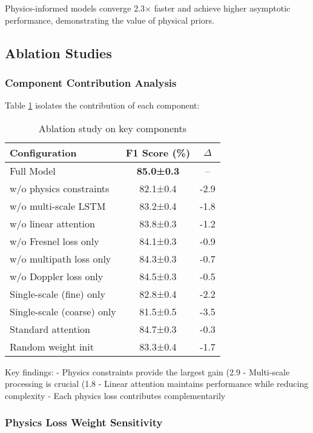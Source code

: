 \documentclass[10pt,journal,compsoc]{IEEEtran}
\begin{document}
Physics-informed models converge 2.3× faster and achieve higher asymptotic performance, demonstrating the value of physical priors.

\subsection{Ablation Studies}

\subsubsection{Component Contribution Analysis}

Table \ref{tab:ablation} isolates the contribution of each component:

\begin{table}[h]
\centering
\caption{Ablation study on key components}
\label{tab:ablation}
\begin{tabular}{lcc}
\toprule
Configuration & F1 Score (\%) & $\Delta$ \\
\midrule
Full Model & \textbf{85.0±0.3} & -- \\
\midrule
w/o physics constraints & 82.1±0.4 & -2.9 \\
w/o multi-scale LSTM & 83.2±0.4 & -1.8 \\
w/o linear attention & 83.8±0.3 & -1.2 \\
\midrule
w/o Fresnel loss only & 84.1±0.3 & -0.9 \\
w/o multipath loss only & 84.3±0.3 & -0.7 \\
w/o Doppler loss only & 84.5±0.3 & -0.5 \\
\midrule
Single-scale (fine) only & 82.8±0.4 & -2.2 \\
Single-scale (coarse) only & 81.5±0.5 & -3.5 \\
Standard attention & 84.7±0.3 & -0.3 \\
Random weight init & 83.3±0.4 & -1.7 \\
\bottomrule
\end{tabular}
\end{table}

Key findings:
- Physics constraints provide the largest gain (2.9%
- Multi-scale processing is crucial (1.8%
- Linear attention maintains performance while reducing complexity
- Each physics loss contributes complementarily

\subsubsection{Physics Loss Weight Sensitivity}
\end{document}
